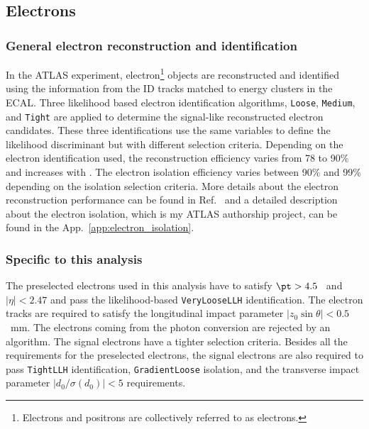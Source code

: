 
\subsection{Electrons}
\label{subsec:event_electrons}


\subsubsection{General electron reconstruction and identification}
\label{subsubsec:event_electrons_general}
In the ATLAS experiment, electron\footnote{Electrons and positrons are collectively referred to as electrons.} objects are reconstructed and identified using the information from the ID tracks matched to energy clusters in the ECAL.
Three likelihood based electron identification algorithms, \texttt{Loose}, \texttt{Medium}, and \texttt{Tight} are applied to determine the signal-like reconstructed electron candidates.
These three identifications use the same variables to define the likelihood discriminant but with different selection criteria.
Depending on the electron identification used, the reconstruction efficiency varies from 78 to 90\% and increases with \met.
The electron isolation efficiency varies between 90\% and 99\% depending on the isolation selection criteria.
More details about the electron reconstruction performance can be found in Ref.~\cite{ATLAS:2016iqc} and a detailed description about the electron isolation, which is my ATLAS authorship project, can be found in the App.~\ref{app:electron_isolation}.


\subsubsection{Specific to this analysis}
\label{subsubsec:event_electrons_specific}
The preselected electrons used in this analysis have to satisfy $\pt > 4.5$~{\GeV} and $|\eta| < 2.47$ and pass the likelihood-based \texttt{VeryLooseLLH} identification.
The electron tracks are required to satisfy the longitudinal impact parameter $|z_{0}\sin\theta| < 0.5$~mm.
The electrons coming from the photon conversion are rejected by an algorithm. 
The signal electrons have a tighter selection criteria.
Besides all the requirements for the preselected electrons, the signal electrons are also required to pass \texttt{TightLLH} identification, \texttt{GradientLoose} isolation, and the transverse impact parameter $|d_{0}/\sigma(d_{0})| < 5$ requirements.

